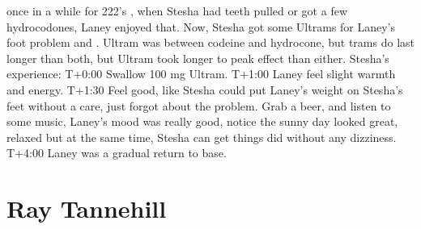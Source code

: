 \documentclass[12pt]{book}
\begin{document}
once in a while for 222's , when Stesha had teeth pulled or got a few hydrocodones, Laney enjoyed that. Now, Stesha got some Ultrams for Laney's foot problem and . Ultram was between codeine and hydrocone, but trams do last longer than both, but Ultram took longer to peak effect than either. Stesha's experience: T+0:00 Swallow 100 mg Ultram. T+1:00 Laney feel slight warmth and energy. T+1:30 Feel good, like Stesha could put Laney's weight on Stesha's feet without a care, just forgot about the problem. Grab a beer, and listen to some music, Laney's mood was really good, notice the sunny day looked great, relaxed but at the same time, Stesha can get things did without any dizziness. T+4:00 Laney was a gradual return to base.



\chapter{Ray Tannehill}
\end{document}
